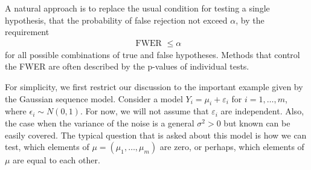 A natural approach is to replace the usual condition for testing a single hypothesis, that the probability of false rejection not exceed $\alpha$, by the requirement
\begin{align*}
\text { FWER } \leq \alpha
\end{align*}
for all possible combinations of true and false hypotheses. Methods that control the FWER are often described by the p-values of individual tests.


For simplicity, we first restrict our discussion to the important example given by the Gaussian sequence model. Consider a model $Y_i=\mu_i+\varepsilon_i$ for $i=1, \ldots, m$, where $\epsilon_i \sim N(0,1)$. For now, we will not assume that $\varepsilon_i$ are independent. Also, the case when the variance of the noise is a general $\sigma^2>0$ but known can be easily covered. The typical question that is asked about this model is how we can test, which elements of $\mu=\left(\mu_1, \ldots, \mu_m\right)$ are zero, or perhaps, which elements of $\mu$ are equal to each other.

